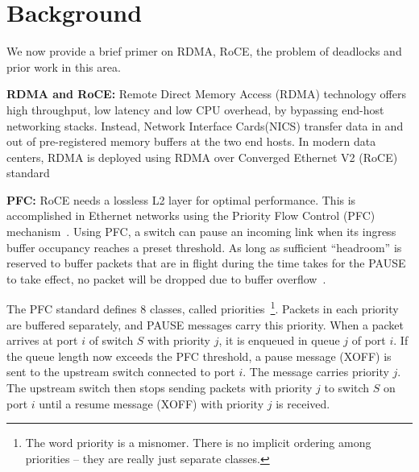 \section{Background}
\label{sec:background}

We now provide a brief primer on RDMA, RoCE, the problem of deadlocks and prior
work in this area.

{\bf RDMA and RoCE:} Remote Direct Memory Access (RDMA) technology offers high
throughput, low latency and low CPU overhead, by bypassing end-host networking
stacks. Instead, Network Interface Cards(NICS) transfer data in and out of
pre-registered memory buffers at the two end hosts.  In modern data centers,
RDMA is deployed using RDMA over Converged Ethernet V2 (RoCE)
standard~\cite{roce,rroce}

{\bf PFC:} RoCE needs a lossless L2 layer for optimal performance. This is
accomplished in Ethernet networks using the Priority Flow Control (PFC)
mechanism~\cite{pfc}.  Using PFC, a switch can pause an incoming link when its
ingress buffer occupancy reaches a preset threshold. As long as sufficient
``headroom'' is reserved to buffer packets that are in flight during the time
takes for the PAUSE to take effect, no packet will be dropped due to buffer
overflow~\cite{cisco-whitepaper,dcqcn}. 

The PFC standard defines 8 classes, called priorities~\footnote{The word priority is a
misnomer. There is no implicit ordering among priorities -- they are really just
separate classes.}. Packets in each priority are buffered separately, and PAUSE
messages carry this priority.  When a packet arrives at port $i$ of switch $S$
with priority $j$, it is enqueued in queue $j$ of port $i$. If the queue length
now exceeds the PFC threshold, a pause message (XOFF) is sent to the upstream
switch connected to port $i$. The message carries priority $j$. The upstream
switch then stops sending packets with priority $j$ to switch $S$ on port $i$ until a resume
message (XOFF) with priority $j$ is received.



